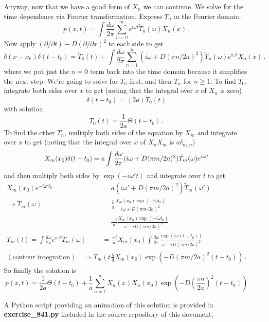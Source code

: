 Anyway, now that we have a good form of $X_n$ we can continue.
We solve for the time dependence via Fourier transformation.
Express $T_n$ in the Fourier domain:
\begin{equation*}
  p(x, t)
  = \int \frac{d\omega}{2\pi} \sum_{n=0}^\infty
    e^{i \omega t} \tilde{T}_n(\omega) X_n(x)
  \, .
\end{equation*}
Now apply $(\partial / \partial t) - D (\partial / \partial x)^2$ to each side to get
\begin{equation*}
  \delta(x - x_0) \delta(t - t_0)
    = \dot{T}_0(t) + \int \frac{d \omega}{2\pi}
    \sum_{n=1}^\infty (i \omega + D (\pi n / 2a)^2)
    \tilde{T}_n(\omega) e^{i \omega t}
    X_n(x)
  \, .
\end{equation*}
where we put just the $n=0$ term back into the time domain because it simplifies the next step.
We're going to solve for $T_0$ first, and then $T_n$ for $n \geq 1$.
To find $T_0$, integrate both sides over $x$ to get (noting that the integral over $x$ of $X_n$ is zero)
\begin{equation*}
  \delta(t - t_0) = (2 a) \dot{T}_0(t)
\end{equation*}
with solution
\begin{equation*}
  T_0(t) = \frac{1}{2 a} \Theta(t - t_0)
  \, .
\end{equation*}
To find the other $T_n$, multiply both sides of the equation by $X_m$ and integrate over $x$ to get (noting that the integral over $x$ of $X_n X_m$ is $a \delta_{m, n}$)
\begin{equation*}
  X_m(x_0) \delta(t - t_0)
  = a \int \frac{d\omega}{2\pi} (i\omega + D(\pi m / 2a)^2) \tilde{T}_m(\omega) e^{i \omega t} \\
\end{equation*}
and then multiply both sides by $\exp(-i \omega' t)$ and integrate over $t$ to get
\begin{align*}
  X_m(x_0) e^{-i \omega' t_0}
  &= a (i \omega' + D(\pi m / 2 a)^2) \tilde{T}_m(\omega') \\
  \Rightarrow \tilde{T}_m(\omega)
  &= \frac{1}{a} \frac{X_m(x_0) \exp(-i \omega t_0)}{i \omega + D (\pi m / 2 a)^2} \\
  &= \frac{-i}{a} \frac{X_m(x_0) \exp(-i \omega t_0)}{\omega - i D (\pi m / 2 a)^2} \\
  T_m(t) = \int \frac{d\omega}{2\pi} e^{i \omega t} \tilde{T}_m(\omega)
  &= \frac{-i}{a} X_m(x_0) \int \frac{d\omega}{2\pi} \frac{\exp(i \omega (t - t_0))}{\omega - i D (\pi m / 2 a)^2} \\
  (\text{contour integration}) \quad \Rightarrow
  T_m(t) &= \frac{1}{a} X_m(x_0) \exp \left( -D (\pi m / 2 a)^2 (t - t_0) \right)
  \, .
\end{align*}
So finally the solution is
\begin{equation*}
  p(x, t) = \frac{1}{2a} \Theta(t - t_0)
  + \frac{1}{a} \sum_{n=1}^\infty X_n(x) X_n(x_0) \exp \left( -D \left( \frac{\pi n}{2 a} \right)^2 (t - t_0) \right)
\end{equation*}

A Python script providing an animation of this solution is provided in \textbf{exercise\_841.py} included in the source repository of this document.
